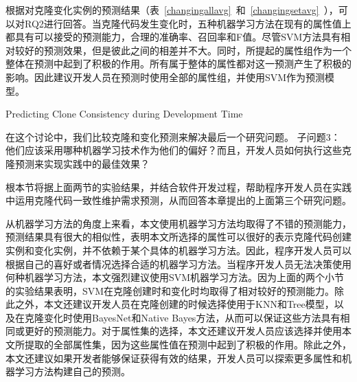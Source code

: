 根据对克隆变化实例的预测结果（表~\ref{changingallavg}~和~\ref{changingsetavg}~），可以对RQ2进行回答。当克隆代码发生变化时，五种机器学习方法在现有的属性值上都具有可以接受的预测能力，合理的准确率、召回率和F值。尽管SVM方法具有相对较好的预测效果，但是彼此之间的相差并不大。同时，所提起的属性组作为一个整体在预测中起到了积极的作用。所有属于整体的属性都对这一预测产生了积极的影响。因此建议开发人员在预测时使用全部的属性组，并使用SVM作为预测模型。




{Predicting Clone Consistency during Development Time}

在这个讨论中，我们比较克隆和变化预测来解决最后一个研究问题。
子问题3：
他们应该采用哪种机器学习技术作为他们的偏好？而且，开发人员如何执行这些克隆预测来实现实践中的最佳效果？


根本节将据上面两节的实验结果，并结合软件开发过程，帮助程序开发人员在实践中运用克隆代码一致性维护需求预测，从而回答本章提出的上面第三个研究问题。

从机器学习方法的角度上来看，本文使用机器学习方法均取得了不错的预测能力，预测结果具有很大的相似性，表明本文所选择的属性可以很好的表示克隆代码创建实例和变化实例，并不依赖于某个具体的机器学习方法。因此，程序开发人员可以根据自己的喜好或者情况选择合适的机器学习方法。当程序开发人员无法决策使用何种机器学习方法，本文强烈建议使用SVM机器学习方法。因为上面的两个小节的实验结果表明，SVM在克隆创建时和变化时均取得了相对较好的预测能力。除此之外，本文还建议开发人员在克隆创建的时候选择使用于KNN和Tree模型，以及在克隆变化时使用BayesNet和Native Bayes方法，从而可以保证这些方法具有相同或更好的预测能力。对于属性集的选择，本文还建议开发人员应该选择并使用本文所提取的全部属性集，因为这些属性值在预测中起到了积极的作用。除此之外，本文还建议如果开发者能够保证获得有效的结果，开发人员可以探索更多属性和机器学习方法构建自己的预测。

